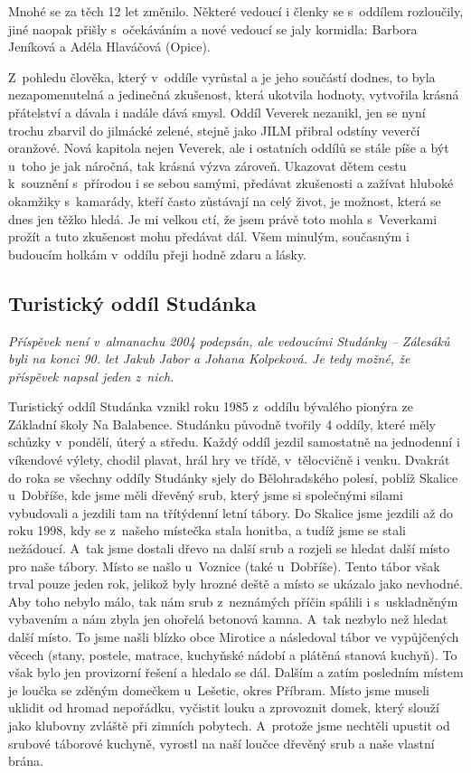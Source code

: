\documentclass[a5paper, 11pt, twoside]{article}
\begin{document}
Mnohé se za těch 12 let změnilo. Některé vedoucí i členky se s~oddílem
rozloučily, jiné naopak přišly s~očekáváním a nové vedoucí se jaly
kormidla: Barbora Jeníková a Adéla Hlaváčová (Opice).

Z~pohledu člověka, který v~oddíle vyrůstal a je jeho součástí dodnes, to
byla nezapomenutelná a jedinečná zkušenost, která ukotvila hodnoty,
vytvořila krásná přátelství a dávala i nadále dává smysl. Oddíl Veverek
nezanikl, jen se nyní trochu zbarvil do jilmácké zelené, stejně jako
JILM přibral odstíny veverčí oranžové. Nová kapitola nejen Veverek, ale
i ostatních oddílů se stále píše a být u~toho je jak náročná, tak krásná
výzva zároveň. Ukazovat dětem cestu k~souznění s~přírodou i se sebou
samými, předávat zkušenosti a zažívat hluboké okamžiky s~kamarády, kteří
často zůstávají na celý život, je možnost, která se dnes jen těžko
hledá. Je mi velkou ctí, že jsem právě toto mohla s~Veverkami prožít a
tuto zkušenost mohu předávat dál. Všem minulým, současným i budoucím
holkám v~oddílu přeji hodně zdaru a lásky.

\clearpage
\subsection{Turistický oddíl Studánka}

\begin{center}
  \textit{Příspěvek není v~almanachu 2004 podepsán, ale vedoucími Studánky
  -- Zálesáků byli na konci 90. let Jakub Jabor a Johana Kolpeková. Je
  tedy možné, že příspěvek napsal jeden z~nich.}
\end{center}

\noindent
Turistický oddíl Studánka vznikl roku 1985 z~oddílu bývalého pionýra ze
Základní školy Na Balabence. Studánku původně tvořily 4 oddíly, které
měly schůzky v~pondělí, úterý a středu. Každý oddíl jezdil samostatně na
jednodenní i víkendové výlety, chodil plavat, hrál hry ve třídě,
v~tělocvičně i venku. Dvakrát do roka se všechny oddíly Studánky sjely do
Bělohradského polesí, poblíž Skalice u~Dobříše, kde jsme měli dřevěný
srub, který jsme si společnými silami vybudovali a jezdili tam na
třítýdenní letní tábory. Do Skalice jsme jezdili až do roku 1998, kdy se
z~našeho místečka stala honitba, a tudíž jsme se stali nežádoucí. A~tak
jsme dostali dřevo na další srub a rozjeli se hledat další místo pro
naše tábory. Místo se našlo u~Voznice (také u~Dobříše). Tento tábor však
trval pouze jeden rok, jelikož byly hrozné deště a místo se ukázalo jako
nevhodné. Aby toho nebylo málo, tak nám srub z~neznámých příčin spálili
i s~uskladněným vybavením a nám zbyla jen ohořelá betonová kamna. A~tak
nezbylo než hledat další místo. To jsme našli blízko obce Mirotice a
následoval tábor ve vypůjčených věcech (stany, postele, matrace,
kuchyňské nádobí a plátěná stanová kuchyň). To však bylo jen provizorní
řešení a hledalo se dál. Dalším a zatím posledním místem je loučka se
zděným domečkem u~Lešetic, okres Příbram. Místo jsme museli uklidit od
hromad nepořádku, vyčistit louku a zprovoznit domek, který slouží jako
klubovny zvláště při zimních pobytech. A~protože jsme nechtěli upustit
od srubové táborové kuchyně, vyrostl na naší loučce dřevěný srub a naše
vlastní brána.
\end{document}
